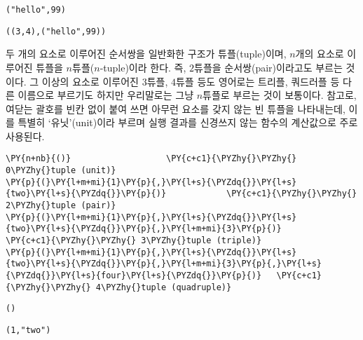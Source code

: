     
    
    \begin{Verbatim}[commandchars=\\\{\}]
("hello",99)
    \end{Verbatim}

    
    
    \begin{Verbatim}[commandchars=\\\{\}]
((3,4),("hello",99))
    \end{Verbatim}

    
    \noindent 두 개의 요소로 이루어진 순서쌍을 일반화한 구조가
튜플(tuple)이며, \(n\)개의 요소로 이루어진 튜플을
\(n\)튜플(\(n\)-tuple)이라 한다. 즉, \(2\)튜플을 순서쌍(pair)이라고도
부르는 것이다. 그 이상의 요소로 이루어진 \(3\)튜플, \(4\)튜플 등도
영어로는 트리플, 쿼드러플 등 다른 이름으로 부르기도 하지만 우리말로는
그냥 \(n\)튜플로 부르는 것이 보통이다. 참고로, 여닫는 괄호를 빈칸 없이
붙여 쓰면 아무런 요소를 갖지 않는 빈 튜플을 나타내는데, 이를 특별히
`유닛'(unit)이라 부르며 실행 결과를 신경쓰지 않는 함수의 계산값으로 주로
사용된다.

    \begin{tcolorbox}[breakable, size=fbox, boxrule=1pt, pad at break*=1mm,colback=cellbackground, colframe=cellborder, top=.75ex]
\begin{Verbatim}[commandchars=\\\{\}]
\PY{n+nb}{()}                   \PY{c+c1}{\PYZhy{}\PYZhy{} 0\PYZhy{}tuple (unit)}
\PY{p}{(}\PY{l+m+mi}{1}\PY{p}{,}\PY{l+s}{\PYZdq{}}\PY{l+s}{two}\PY{l+s}{\PYZdq{}}\PY{p}{)}            \PY{c+c1}{\PYZhy{}\PYZhy{} 2\PYZhy{}tuple (pair)}
\PY{p}{(}\PY{l+m+mi}{1}\PY{p}{,}\PY{l+s}{\PYZdq{}}\PY{l+s}{two}\PY{l+s}{\PYZdq{}}\PY{p}{,}\PY{l+m+mi}{3}\PY{p}{)}          \PY{c+c1}{\PYZhy{}\PYZhy{} 3\PYZhy{}tuple (triple)}
\PY{p}{(}\PY{l+m+mi}{1}\PY{p}{,}\PY{l+s}{\PYZdq{}}\PY{l+s}{two}\PY{l+s}{\PYZdq{}}\PY{p}{,}\PY{l+m+mi}{3}\PY{p}{,}\PY{l+s}{\PYZdq{}}\PY{l+s}{four}\PY{l+s}{\PYZdq{}}\PY{p}{)}   \PY{c+c1}{\PYZhy{}\PYZhy{} 4\PYZhy{}tuple (quadruple)}
\end{Verbatim}
\end{tcolorbox}

    
    \begin{Verbatim}[commandchars=\\\{\}]
()
    \end{Verbatim}

    
    
    \begin{Verbatim}[commandchars=\\\{\}]
(1,"two")
    \end{Verbatim}

